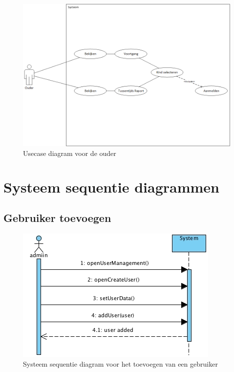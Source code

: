 \documentclass[a4paper]{article}
\begin{document}
\begin{figure}[H]
  \includegraphics[width=\textwidth]{uc_ouder}
  \caption{Usecase diagram voor de ouder}
  \label{fig:usecase_ouder}
\end{figure}

\newpage
\section{Systeem sequentie diagrammen}
\subsection{Gebruiker toevoegen}
\begin{figure}[H]
  \includegraphics[width=\textwidth]{addUserSSD}
  \caption{Systeem sequentie diagram voor het toevoegen van een gebruiker}
  \label{fig:SSD_addUser}
\end{figure}
\end{document}

